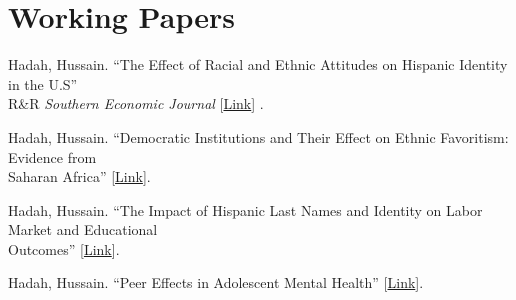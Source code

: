 \documentclass[letterpaper]{article}
\renewenvironment{itemize}{
  \begin{list}{}{
    \setlength{\leftmargin}{1.5em}
  }
}{
  \end{list}
}
\begin{document}
\section*{Working Papers}
\vspace{2 mm}
\begin{itemize}
\item Hadah, Hussain. ``The Effect of Racial and Ethnic Attitudes on Hispanic Identity in the U.S'' \\{\makebox[4mm]{\hfill}} R\&R \textit{Southern Economic Journal }[\href{https://dx.doi.org/10.2139/ssrn.4566232}{Link}] .
\item Hadah, Hussain. ``Democratic Institutions and Their Effect on Ethnic Favoritism: Evidence from \\{\makebox[4mm]{\hfill}} Saharan Africa'' [\href{https://dx.doi.org/10.2139/ssrn.4566225}{Link}].
\item Hadah, Hussain. ``The Impact of Hispanic Last Names and Identity on Labor Market and Educational \\{\makebox[4mm]{\hfill}} Outcomes'' [\href{https://dx.doi.org/10.2139/ssrn.4566234}{Link}]. 
\item Hadah, Hussain. ``Peer Effects in Adolescent Mental Health'' [\href{https://hhadah.github.io/Depression_Idea/my_paper/Hadah-Peer-Effect-Depression.pdf}{Link}].  

\end{itemize}
\vspace{2 mm}
\end{document}
